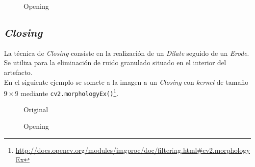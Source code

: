 \begin{figure}[H]
  \centering \setlength\fboxsep{0pt} \setlength\fboxrule{0.5pt}
  \caption{Opening}
\end{figure}

\subsection{\emph{Closing}}
La técnica de \emph{Closing} consiste en la realización de un
\emph{Dilate} seguido de un \emph{Erode}. Se utiliza para la
eliminación de ruido granulado situado en el interior del
artefacto. \\
En el siguiente ejemplo se somete a la imagen a un \emph{Closing} con
\emph{kernel} de tamaño $9 \times 9$ mediante
\texttt{cv2.morphologyEx()}\footnote{\url{http://docs.opencv.org/modules/imgproc/doc/filtering.html\#cv2.morphologyEx}}.

\begin{figure}[H]
  \caption{Original}
  \centering \setlength\fboxsep{0pt} \setlength\fboxrule{0.5pt}
\end{figure}

\begin{figure}[H]
  \centering \setlength\fboxsep{0pt} \setlength\fboxrule{0.5pt}
  \caption{Opening}
\end{figure}

